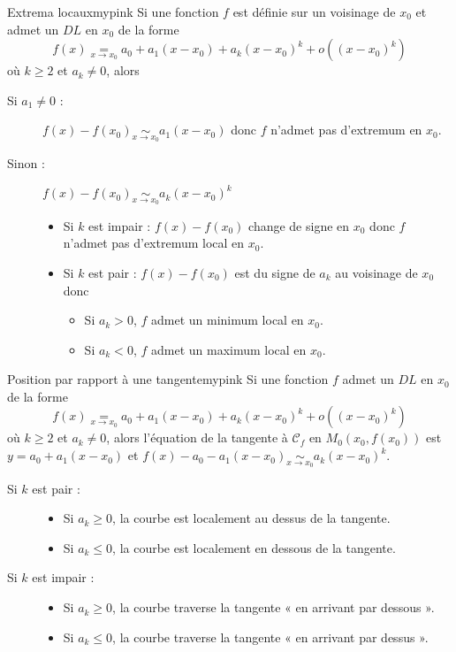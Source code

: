     \begin{omed}{Extrema locaux}{mypink}
        Si une fonction $f$ est définie sur un voisinage de $x_0$ et admet un $DL$ en $x_0$ de la forme \[ f(x) \underset{x \rightarrow x_0}{=} a_0 + a_1(x-x_0) + a_k (x - x_0)^k + o\left((x-x_0)^k\right) \] où $k \geq 2$ et $a_k \neq 0$, alors 
    \begin{description}
        \item[Si $a_1 \neq 0$ :] $f(x) - f(x_0) \underset{x \rightarrow x_0}{\sim} a_1(x-x_0)$ donc $f$ n’admet pas d’extremum en $x_0$.
        \item[Sinon :] $f(x) - f(x_0) \underset{x \rightarrow x_0}{\sim} a_k(x-x_0)^k$ \begin{itemize}
            \item Si $k$ est impair : $f(x) - f(x_0)$ change de signe en $x_0$ donc $f$ n’admet pas d’extremum local en $x_0$. 
            \item Si $k$ est pair : $f(x) - f(x_0)$ est du signe de $a_k$ au voisinage de $x_0$ donc \begin{itemize}[label=$-$]
                \item Si $a_k > 0$, $f$ admet un minimum local en $x_0$.
                \item Si $a_k < 0$, $f$ admet un maximum local en $x_0$.
            \end{itemize}
        \end{itemize}
    \end{description}
    \end{omed}

    \begin{omed}{Position par rapport à une tangente}{mypink}
        Si une fonction $f$ admet un $DL$ en $x_0$ de la forme 
    \[  f(x) \underset{x \rightarrow x_0}{=} a_0 + a_1(x-x_0) + a_k (x - x_0)^k + o\left((x-x_0)^k\right) \] 
    où $k \geq 2$ et $a_k \neq 0$, alors l’équation de la tangente à $\mathcal{C}_f$ en $M_0(x_0,f(x_0))$ est \newline $y = a_0 + a_1(x-x_0)$ et $f(x) - a_0 - a_1(x-x_0) \underset{x \rightarrow x_0}{\sim} a_k(x-x_0)^k$.
    \begin{description}
        \item[Si $k$ est pair :] \phantom{bou}  
        \begin{itemize}
            \item Si $a_k \geq 0$, la courbe est localement au dessus de la tangente.
            \item Si $a_k \leq 0$, la courbe est localement en dessous de la tangente.
        \end{itemize}
        \item[Si $k$ est impair :] \phantom{bou} 
        \begin{itemize}
            \item Si $a_k \geq 0$, la courbe traverse la tangente « en arrivant par dessous ».
            \item Si $a_k \leq 0$, la courbe traverse la tangente « en arrivant par dessus ».
        \end{itemize}
    \end{description}
    \end{omed}

